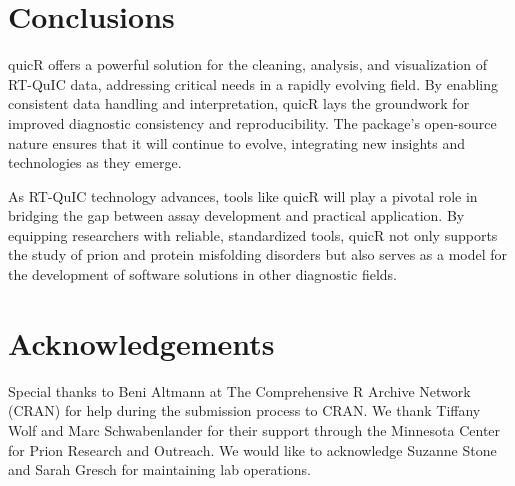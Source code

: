 \documentclass[preprint,12pt, a4paper]{elsarticle}
\begin{document}
\section{Conclusions}
    quicR offers a powerful solution for the cleaning, analysis, and visualization of RT-QuIC data, addressing critical needs in a rapidly evolving field. By enabling consistent data handling and interpretation, quicR lays the groundwork for improved diagnostic consistency and reproducibility. The package's open-source nature ensures that it will continue to evolve, integrating new insights and technologies as they emerge.

    As RT-QuIC technology advances, tools like quicR will play a pivotal role in bridging the gap between assay development and practical application. By equipping researchers with reliable, standardized tools, quicR not only supports the study of prion and protein misfolding disorders but also serves as a model for the development of software solutions in other diagnostic fields.

\section*{Acknowledgements}
\label{}
Special thanks to Beni Altmann at The Comprehensive R Archive Network (CRAN) for help during the submission process to CRAN. We thank Tiffany Wolf and Marc Schwabenlander for their support through the Minnesota Center for Prion Research and Outreach. We would like to acknowledge Suzanne Stone and Sarah Gresch for maintaining lab operations.




 



\end{document}
